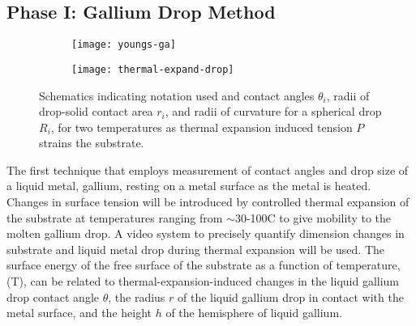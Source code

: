 
\subsection{Phase I: Gallium Drop Method}


\begin{wrapfigure}[12]{r}{0.5\linewidth}
	\begin{subfigure}[b]{0.5\textwidth}
		\texttt{[image: youngs-ga]}
		\label{fig:youngs-ga}
	\end{subfigure}
	\begin{subfigure}[b]{0.5\textwidth}
		\texttt{[image: thermal-expand-drop]}
		\label{fig:thermal-expand-drop}
	\end{subfigure}
	\caption{Schematics indicating notation used and contact angles $\theta_{i}$, radii of drop-solid contact area $r_{i}$, and radii of curvature for a spherical drop $R_{i}$, for two temperatures as thermal expansion induced tension $P$ strains the substrate.}
	\label{fig:therm-exp-ga}
\end{wrapfigure}
The first technique that employs measurement of contact angles and drop size of a liquid metal, gallium, resting on a metal surface as the metal is heated. Changes in surface tension will be introduced by controlled thermal expansion of the substrate at temperatures ranging from $\sim$30-100\degree C to give mobility to the molten gallium drop.
A video system to precisely quantify dimension changes in substrate and liquid metal drop during thermal expansion will be used. The surface energy of the free surface of the substrate as a function of temperature, \gamSV(T), can be related to thermal-expansion-induced changes in the liquid gallium drop contact angle $\theta$, the radius $r$ of the liquid gallium drop in contact with the metal surface, and the height $h$ of the hemisphere of liquid gallium. 

